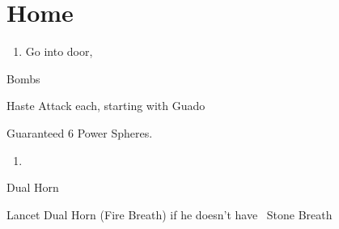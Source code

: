 \chapter{Home}

\begin{enumerate}
    \item Go into door, \sd
\end{enumerate}
\begin{battle}{Bombs}
    \begin{itemize}
        \tidusf Haste \tidus
        \tidusf Attack each, starting with Guado
    \end{itemize}
    Guaranteed 6 Power Spheres.
\end{battle}
\begin{enumerate}[resume]
    \item \sd
\end{enumerate}
\begin{battle}{Dual Horn}
    \begin{itemize}
        \kimahrif Lancet Dual Horn (Fire Breath) if he doesn't have \od
        \kimahrif \od\ Stone Breath
    \end{itemize}
\end{battle}
